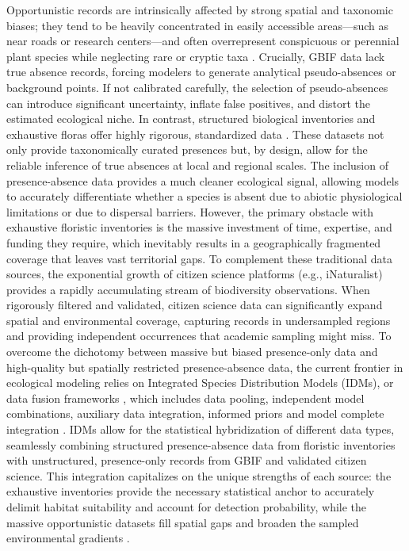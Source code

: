 \documentclass{article}
\begin{document}
Opportunistic records are intrinsically affected by strong spatial and taxonomic biases; they tend to be heavily concentrated in easily accessible areas—such as near roads or research centers—and often overrepresent conspicuous or perennial plant species while neglecting rare or cryptic taxa \cite{insects16080769}. Crucially, GBIF data lack true absence records, forcing modelers to generate analytical pseudo-absences or background points. If not calibrated carefully, the selection of pseudo-absences can introduce significant uncertainty, inflate false positives, and distort the estimated ecological niche. In contrast, structured biological inventories and exhaustive floras offer highly rigorous, standardized data \cite{barbet2012selecting,chefaoui2008assessing,phillips2009sample,lobo2010uncertain}. These datasets not only provide taxonomically curated presences but, by design, allow for the reliable inference of true absences at local and regional scales. The inclusion of presence-absence data provides a much cleaner ecological signal, allowing models to accurately differentiate whether a species is absent due to abiotic physiological limitations or due to dispersal barriers. However, the primary obstacle with exhaustive floristic inventories is the massive investment of time, expertise, and funding they require, which inevitably results in a geographically fragmented coverage that leaves vast territorial gaps.
To complement these traditional data sources, the exponential growth of citizen science platforms (e.g., iNaturalist) provides a rapidly accumulating stream of biodiversity observations. When rigorously filtered and validated, citizen science data can significantly expand spatial and environmental coverage, capturing records in undersampled regions and providing independent occurrences that academic sampling might miss.
To overcome the dichotomy between massive but biased presence-only data and high-quality but spatially restricted presence-absence data, the current frontier in ecological modeling relies on Integrated Species Distribution Models (IDMs), or data fusion frameworks \cite{isaac2020data,Datafusion2025} , which includes data pooling, independent model combinations, auxiliary data integration, informed priors and model complete integration \cite{fletcher2019practical}. IDMs allow for the statistical hybridization of different data types, seamlessly combining structured presence-absence data from floristic inventories with unstructured, presence-only records from GBIF and validated citizen science. This integration capitalizes on the unique strengths of each source: the exhaustive inventories provide the necessary statistical anchor to accurately delimit habitat suitability and account for detection probability, while the massive opportunistic datasets fill spatial gaps and broaden the sampled environmental gradients \cite{isaac2020data,Grattarola2023}.
\end{document}
